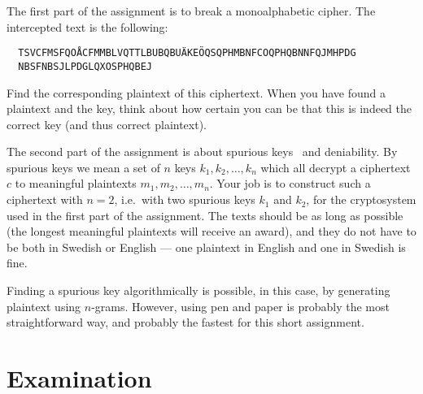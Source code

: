 \documentclass[a4paper]{llncs}
\begin{document}
The first part of the assignment is to break a monoalphabetic cipher.
The intercepted text is the following:
\begin{verbatim}
  TSVCFMSFQOÅCFMMBLVQTTLBUBQBUÄKEÖQSQPHMBNFCOQPHQBNNFQJMHPDG
  NBSFNBSJLPDGLQXOSPHQBEJ
\end{verbatim}
Find the corresponding plaintext of this ciphertext.
When you have found a plaintext and the key, think about how certain you can be 
that this is indeed the correct key (and thus correct plaintext).

The second part of the assignment is about spurious 
keys~\cite[Chap.~2]{Stinson2006cta} and deniability.
By spurious keys we mean a set of \(n\) keys \(k_1, k_2, \dotsc, k_n\) which 
all decrypt a ciphertext \(c\) to meaningful plaintexts \(m_1, m_2, \ldots, 
  m_n\).
Your job is to construct such a ciphertext with \(n = 2\), i.e.\ with two 
spurious keys \(k_1\) and \(k_2\), for the cryptosystem used in the first part 
of the assignment.
The texts should be as long as possible (the longest meaningful plaintexts will 
receive an award), and they do not have to be both in Swedish or English --- 
one plaintext in English and one in Swedish is fine.

Finding a spurious key algorithmically is possible, in this case, by generating 
plaintext using \(n\)-grams.
However, using pen and paper is probably the most straightforward way, and 
probably the fastest for this short assignment.


\section{Examination}
\end{document}
